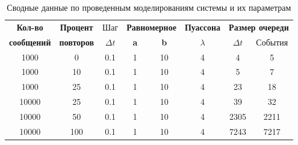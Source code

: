 \begin{table}[ht]
	\small
	\begin{center}
		\caption{Сводные данные по проведенным моделированиям системы и их параметрам}
		\label{tbl:result}
		\begin{tabular}{|c|c|c|c|c|c|c|c|}
            \hline
            \bfseries Кол-во & \bfseries Процент & Шаг & \multicolumn{2}{|c|}{\bfseries Равномерное} & \bfseries Пуассона & \multicolumn{2}{|c|}{\bfseries Размер очереди } \\\cline{4-8}
			
            \bfseries сообщений & \bfseries повторов & $\Delta t$ & \bfseries a & \bfseries b & \bfseries $\lambda$ & $\Delta t$ & События \\\hline
            
            1000  & 0   & 0.1 & 1 & 10 & 4 & 4    & 5    \\
            1000  & 10  & 0.1 & 1 & 10 & 4 & 5    & 7    \\
            1000  & 25  & 0.1 & 1 & 10 & 4 & 23   & 18   \\
            10000 & 25  & 0.1 & 1 & 10 & 4 & 39   & 32   \\
            10000 & 50  & 0.1 & 1 & 10 & 4 & 2305 & 2211 \\
            10000 & 100 & 0.1 & 1 & 10 & 4 & 7243 & 7217 \\
            \hline
		\end{tabular}
	\end{center}
\end{table}
